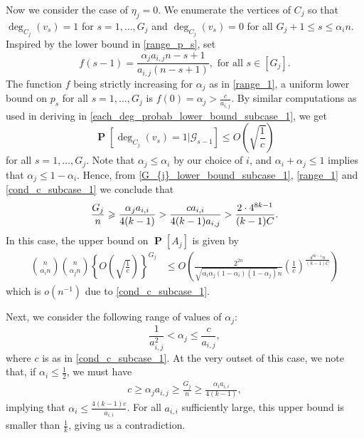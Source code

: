 \documentclass[11pt,reqno]{amsart}
\theoremstyle{definition}
\theoremstyle{remark}
\theoremstyle{conjecture}
\DeclareMathOperator{\Prob}{\mathbf{P}}
\begin{document}
Now we consider the case of $\eta_{j} = 0$. We enumerate the vertices of $C_{j}$ so that $\deg_{C_{j}}(v_{s}) = 1$ for $s = 1, \ldots, G_{j}$ and $\deg_{C_{j}}(v_{s}) = 0$ for all $G_{j}+1 \leqslant s \leqslant \alpha_{i}n$. Inspired by the lower bound in \eqref{range_p_s}, set
\begin{equation}
f(s-1) = \frac{\alpha_{j} a_{i,j} n - s + 1}{a_{i,j}(n-s+1)}, \text{ for all } s \in [G_{j}]. \nonumber
\end{equation} 
The function $f$ being strictly increasing for $\alpha_{j}$ as in \eqref{range_1}, a uniform lower bound on $p_{s}$ for all $s = 1, \ldots, G_{j}$ is $f(0) = \alpha_{j} > \frac{c}{a_{i,j}}$. By similar computations as used in deriving in \eqref{each_deg_probab_lower_bound_subcase_1}, we get
\begin{equation}\label{each_deg_probab_lower_bound_subcase_1_eta_0}
\Prob\left[\deg_{C_{j}}(v_{s}) = 1\Big|\mathcal{G}_{s-1}\right] \leqslant O\left(\sqrt{\frac{1}{c}}\right)
\end{equation}
for all $s = 1, \ldots, G_{j}$. Note that $\alpha_{j} \leqslant \alpha_{i}$ by our choice of $i$, and $\alpha_{i} + \alpha_{j} \leqslant 1$ implies that $\alpha_{j} \leqslant 1 - \alpha_{i}$. Hence, from \eqref{G_{j}_lower_bound_subcase_1}, \eqref{range_1} and \eqref{cond_c_subcase_1} we conclude that
\begin{equation}\label{G_{j}_lower_bound_subcase_1_subsub_1}
\frac{G_{j}}{n} \geqslant \frac{\alpha_{j} a_{i,i}}{4(k-1)} > \frac{c a_{i,i}}{4 (k-1) a_{i,j}} > \frac{2 \cdot 4^{8k-1}}{(k-1)C}.
\end{equation}
In this case, the upper bound on $\Prob[A_{j}]$ is given by
\begin{align}
{n \choose \alpha_{i}n} {n \choose \alpha_{j}n} \left\{O\left(\sqrt{\frac{1}{c}}\right)\right\}^{G_{j}} &\leqslant O\left(\frac{2^{2n}}{\sqrt{\alpha_{i} \alpha_{j} (1-\alpha_{i}) (1-\alpha_{j})} n} \left(\frac{1}{c}\right)^{\frac{4^{8k-1} n}{(k-1)C}}\right) \nonumber
\end{align}
which is $o(n^{-1})$ due to \eqref{cond_c_subcase_1}.

Next, we consider the following range of values of $\alpha_{j}$:
\begin{equation}\label{range_2}
\frac{1}{a_{i,j}^{2}} < \alpha_{j} \leqslant \frac{c}{a_{i,j}},
\end{equation}
where $c$ is as in \eqref{cond_c_subcase_1}. At the very outset of this case, we note that, if $\alpha_{i} \leqslant \frac{1}{2}$, we must have
\begin{align}
c \geqslant \alpha_{j} a_{i,j} \geqslant \frac{G_{j}}{n} \geqslant \frac{\alpha_{i} a_{i,i}}{4(k-1)}, \nonumber
\end{align}
implying that $\alpha_{i} \leqslant \frac{4(k-1)c}{a_{i,i}}$. For all $a_{i,i}$ sufficiently large, this upper bound is smaller than $\frac{1}{k}$, giving us a contradiction. 
\end{document}
